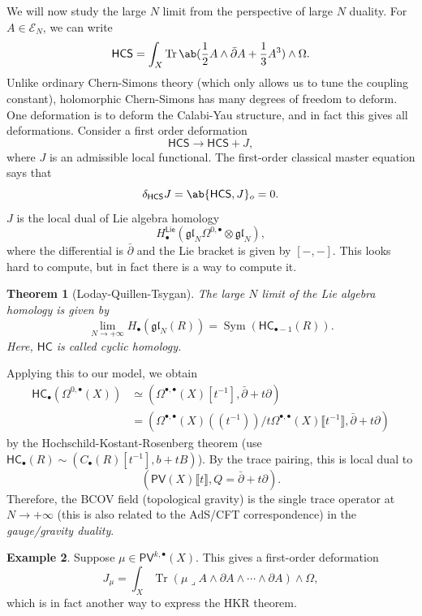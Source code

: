 \documentclass{amsart}
\newtheorem{thm}{Theorem}[section]
\theoremstyle{definition}
\newtheorem{exm}[thm]{Example}
\theoremstyle{remark}
\theoremstyle{plain}
\theoremstyle{definition}
\theoremstyle{remark}
\newcommand{\mc}[1]{\mathcal{#1}}
\newcommand{\mf}[1]{\mathfrak{#1}}
\newcommand{\on}[1]{\operatorname{#1}}
\newcommand{\ms}[1]{\mathsf{#1}}
\newcommand{\1}{\mathbf{1}}
\newcommand{\2}{\mathbf{2}}
\newcommand{\3}{\mathbf{3}}
\newcommand{\ps}[1]{\lBrack #1 \rBrack}
\newcommand{\ls}[1]{(\!( #1 )\!)}
\newcommand{\gl}{\mf{gl}}
\newcommand{\dbar}{\bar{\partial}}
\DeclareMathOperator{\Sym}{Sym}
\begin{document}
We will now study the large \(N\) limit from the perspective of large \(N\) duality. For \(A \in \mc{E}_N\), we can write
\[ \ms{HCS} = \int_X \on{Tr} \ab(\frac{1}{2} A \wedge \dbar A + \frac{1}{3} A^3) \wedge \Omega. \]
Unlike ordinary Chern-Simons theory (which only allows us to tune the coupling constant), holomorphic Chern-Simons has many degrees of freedom to deform. One deformation is to deform the Calabi-Yau structure, and in fact this gives all deformations. Consider a first order deformation 
\[ \ms{HCS} \to \ms{HCS} + J, \]
where \(J\) is an admissible local functional. The first-order classical master equation says that
\[ \delta_{\ms{HCS}} J = \ab\{\ms{HCS}, J\}_o = 0. \]
\(J\) is the local dual of Lie algebra homology
\[ H_{\bullet}^{\ms{Lie}}(\gl_N \Omega^{0, \bullet} \otimes \gl_N), \]
where the differential is \(\dbar\) and the Lie bracket is given by \([-,-]\). This looks hard to compute, but in fact there is a way to compute it.

\begin{thm}[Loday-Quillen-Tsygan]
    The large \(N\) limit of the Lie algebra homology is given by
    \[ \lim_{N \to +\infty} H_{\bullet}(\mf{gl}_N(R)) = \Sym(\ms{HC}_{\bullet-1}(R)). \]
    Here, \(\ms{HC}\) is called \textit{cyclic homology}.
\end{thm}

Applying this to our model, we obtain
\begin{align*}
    \ms{HC}_{\bullet}(\Omega^{0, \bullet}(X)) &\simeq (\Omega^{\bullet, \bullet}(X)[t^{-1}], \dbar + t \partial) \\
    &= (\Omega^{\bullet, \bullet}(X) \ls{t^{-1}} / t \Omega^{\bullet, \bullet}(X) \ps{t^{-1}}, \dbar + t \partial)
\end{align*}
by the Hochschild-Kostant-Rosenberg theorem (use \(\ms{HC}_{\bullet}(R) \sim (C_{\bullet}(R)[t^{-1}], b + tB)\)).
By the trace pairing, this is local dual to 
\[ (\ms{PV}(X) \ps{t}, Q = \dbar + t \partial). \]
Therefore, the BCOV field (topological gravity) is the single trace operator at \(N \to +\infty\) (this is also related to the AdS/CFT correspondence) in the \textit{gauge/gravity duality}.

\begin{exm}
    Suppose \(\mu \in \ms{PV}^{k, \bullet}(X)\). This gives a first-order deformation
    \[ J_{\mu} = \int_X \on{Tr} (\mu \lrcorner A \wedge \partial A \wedge \cdots \wedge \partial A) \wedge \Omega, \]
    which is in fact another way to express the HKR theorem.
\end{exm}
\end{document}
